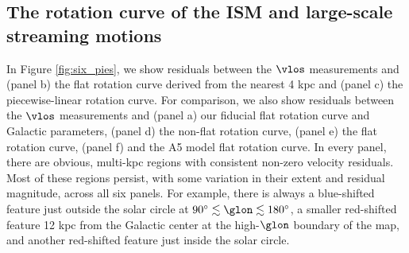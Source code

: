 \subsection{The rotation curve of the ISM and large-scale streaming motions}
\label{sec:rotation_discussion}
In Figure \ref{fig:six_pies}, we show residuals between the $\vlos$ measurements and (panel b) the flat rotation curve derived from the nearest 4 kpc and (panel c) the piecewise-linear rotation curve. 
For comparison, we also show residuals between the $\vlos$ measurements and (panel a) our fiducial flat rotation curve and Galactic parameters, (panel d) the \Clemens non-flat rotation curve, (panel e) the \cite{2012ApJ...759..131B} flat rotation curve, (panel f) and the \Reid A5 model flat rotation curve.
In every panel, there are obvious, multi-kpc regions with consistent non-zero velocity residuals.
Most of these regions persist, with some variation in their extent and residual magnitude, across all six panels. 
For example, there is always a blue-shifted feature just outside the solar circle at $90^\circ \lesssim \glon \lesssim 180^\circ$, a smaller red-shifted feature 12 kpc from the Galactic center at the high-$\glon$ boundary of the map, and another red-shifted feature just inside the solar circle. 
